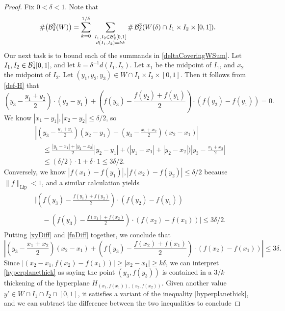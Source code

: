 \begin{proof}
Fix $0 < \delta < 1$. Note that
	\begin{equation}\label{deltaCoveringWSum}
		\# \bigl(\mathcal B_{\delta}^3(W) \bigr) = \sum_{k = 0}^{1/\delta}\ \sum_{\substack{I_1, I_2 \in \operatorname{\mathcal{B}}^1_\delta[0,1]\\d(I_1,I_2) = k\delta}} \# \operatorname{\mathcal{B}}^3_\delta(W(\delta) \cap I_1 \times I_2 \times [0,1]).
	\end{equation}
	Our next task is to bound each of the summands in \eqref{deltaCoveringWSum}.
	 Let $I_1, I_2 \in \operatorname{\mathcal{B}}^1_\delta[0,1]$, and let $k = \delta^{-1}d(I_1,I_2)$. Let $x_1$ be the midpoint of $I_1$, and $x_2$ the midpoint of $I_2$. Let $(y_1,y_2,y_3) \in W \cap I_1 \times I_2 \times [0,1]$. Then it follows from \eqref{def-H} that 
	\[ \left( y_3 - \frac{y_1 + y_2}{2} \right) \cdot (y_2 - y_1) + \left( f(y_3) - \frac{f(y_2) + f(y_1)}{2} \right) \cdot (f(y_2) - f(y_1)) = 0. \]
	We know $|x_1 - y_1|, |x_2 - y_2| \leq \delta/2$, so
	\begin{align} \label{xyDiff}
		&\left| \left( y_3 - \frac{y_1 + y_2}{2} \right) (y_2 - y_1) - \left( y_3 - \frac{x_1 + x_2}{2} \right) (x_2 - x_1) \right| \nonumber\\
		&\ \ \ \ \ \leq \frac{|y_1 - x_1| + |y_2 - x_2|}{2} |y_2 - y_1| + \Big( |y_1 - x_1| + |y_2 - x_2| \Big) \left| y_3 - \frac{x_1 + x_2}{2} \right|\\
		&\ \ \ \ \ \leq (\delta/2) \cdot 1 + \delta \cdot 1 \leq 3\delta/2. \nonumber
	\end{align}
	Conversely, we know $|f(x_1) - f(y_1)|, |f(x_2) - f(y_2)| \leq \delta/2$ because $\| f \|_{\text{Lip}} < 1$, and a similar calculation yields
	\begin{align} \label{fnDiff}
	\begin{split}
		&\Big| \left( f(y_3) - \frac{f(y_1) + f(y_2)}{2} \right) \cdot (f(y_2) - f(y_1))\\
		\\&\ \ \ \ \ - \left( f(y_3) - \frac{f(x_1) + f(x_2)}{2} \right) \cdot (f(x_2) - f(x_1)) \Big|\leq 3\delta/2.
	\end{split}
	\end{align}
	Putting \eqref{xyDiff} and \eqref{fnDiff} together, we conclude that
	\begin{equation} \label{hyperplanethick}
		\left| \left( y_3 - \frac{x_1 + x_2}{2} \right) (x_2 - x_1) + \left( f(y_3) - \frac{f(x_2) + f(x_1)}{2} \right) \cdot (f(x_2) - f(x_1)) \right| \leq 3\delta.
	\end{equation}
	Since $|(x_2-x_1,f(x_2)-f(x_1))| \geq |x_2-x_1| \geq k\delta$, we can interpret \eqref{hyperplanethick} as saying the point $(y_3, f(y_3))$ is contained in a $3/k$ thickening of the hyperplane $H_{(x_1,f(x_1)), (x_2,f(x_2))}$. Given another value $y' \in W \cap I_1 \cap I_2 \cap [0,1]$, it satisfies a variant of the inequality \eqref{hyperplanethick}, and we can subtract the difference between the two inequalities to conclude

\end{proof}

